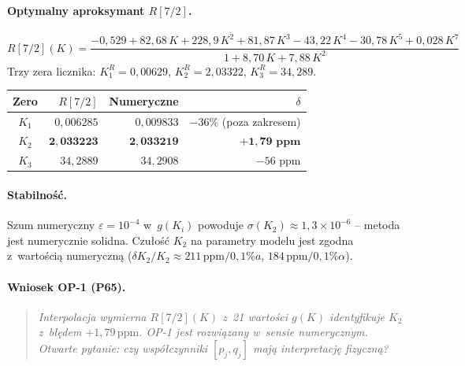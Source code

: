 \paragraph{Optymalny aproksymant $R[7/2]$.}
\begin{equation}
  R[7/2](K) =
  \frac{-0{,}529 + 82{,}68\,K + 228{,}9\,K^2 + 81{,}87\,K^3
        - 43{,}22\,K^4 - 30{,}78\,K^5 + 0{,}028\,K^7}
       {1 + 8{,}70\,K + 7{,}88\,K^2}
  \label{eq:R72}
\end{equation}
Trzy zera licznika: $K_1^R=0{,}00629$, $K_2^R=2{,}03322$, $K_3^R=34{,}289$.
\begin{center}
\begin{tabular}{crrr}
\hline
Zero & $R[7/2]$ & Numeryczne & $\delta$ \\
\hline
$K_1$ & $0{,}006285$ & $0{,}009833$ & $-36\%$ (poza zakresem) \\
$K_2$ & $\mathbf{2{,}033223}$ & $\mathbf{2{,}033219}$ & $\mathbf{+1{,}79\text{ ppm}}$ \\
$K_3$ & $34{,}2889$ & $34{,}2908$ & $-56\text{ ppm}$ \\
\hline
\end{tabular}
\end{center}

\paragraph{Stabilno\'s\'c.}
Szum numeryczny $\varepsilon=10^{-4}$ w~$g(K_i)$ powoduje
$\sigma(K_2) \approx 1{,}3\times10^{-6}$ -- metoda jest numerycznie solidna.
Czu\l{}o\'s\'c $K_2$ na parametry modelu jest zgodna z~warto\'sci\k{a} numeryczn\k{a}
($\delta K_2/K_2 \approx 211\,\mathrm{ppm}/0{,}1\%a$,\;
$184\,\mathrm{ppm}/0{,}1\%\alpha$).

\paragraph{Wniosek OP-1 (P65).}
\begin{quote}
\emph{Interpolacja wymierna $R[7/2](K)$ z~21 warto\'sci $g(K)$ identyfikuje
$K_2$ z~b\l{}\k{e}dem $+1{,}79\,\mathrm{ppm}$.
OP-1 jest rozwi\k{a}zany w~sensie numerycznym.
Otwarte pytanie: czy wsp\'o\l{}czynniki $[p_j, q_j]$
maj\k{a} interpretacj\k{e} fizyczn\k{a}?}
\end{quote}

